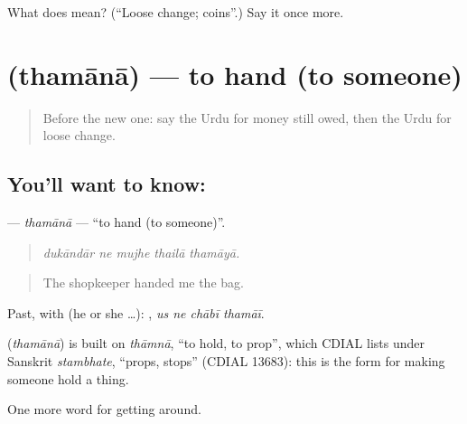 \begin{tcolorbox}[breakable,colback=teal!4,colframe=teal!35!black,title={Before you move on}]
What does  mean? (\textquotedblleft{}Loose change; coins\textquotedblright{}.) Say it once more.
\end{tcolorbox}
\section[\texorpdfstring{\ur{تھمانا} (thamānā)}{تھمانا (thamānā)}]{ (thamānā) — to hand (to someone)}

\label{lesson:UR-C425-thamana}



\begin{quote}
Before the new one: say the Urdu for money still owed, then the Urdu for loose change.
\end{quote}

\subsection*{You'll want to know: }
\textbf{} — \emph{thamānā} — \textquotedblleft{}to hand (to someone)\textquotedblright{}.

\begin{quote}
    
\end{quote}

\begin{quote}
\emph{dukāndār ne mujhe thailā thamāyā.}
\end{quote}

\begin{quote}
The shopkeeper handed me the bag.
\end{quote}

Past, with  (he or she …):    , \emph{us ne chābī thamāī}.

\begin{cousinweb}
\textbf{} (\emph{thamānā}) is built on \emph{thāmnā}, \textquotedblleft{}to hold, to prop\textquotedblright{}, which CDIAL lists under Sanskrit \emph{stambhate}, \textquotedblleft{}props, stops\textquotedblright{} (CDIAL 13683): this is the form for making someone hold a thing.
\end{cousinweb}

\begin{grammarlens}[title={What you've built}]
One more word for getting around.
\end{grammarlens}

